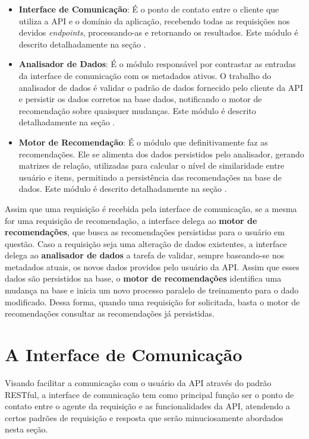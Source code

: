\documentclass[12pt, openright, oneside, a4paper, brazil]{abntex2}
\begin{document}
\begin{itemize}

	\item \textbf{Interface de Comunicação}: É o ponto de contato entre o cliente que utiliza a API e o domínio da aplicação, recebendo todas as requisições nos devidos \textit{endpoints}, processando-as e retornando os resultados. Este módulo é descrito detalhadamente na seção .

	\item \textbf{Analisador de Dados}: É o módulo responsável por contrastar as entradas da interface de comunicação com os metadados ativos. O trabalho do analisador de dados é validar o padrão de dados fornecido pelo cliente da API e persistir os dados corretos na base dados, notificando o motor de recomendação sobre quaisquer mudanças. Este módulo é descrito detalhadamente na seção .

	\item \textbf{Motor de Recomendação}: É o módulo que definitivamente faz as recomendações. Ele se alimenta dos dados persistidos pelo analisador, gerando matrizes de relação, utilizadas para calcular o nível de similaridade entre usuário e itens, permitindo a persistência das recomendações na base de dados. Este módulo é descrito detalhadamente na seção .

\end{itemize}

Assim que uma requisição é recebida pela interface de comunicação, se a mesma for uma requisição de recomendação, a interface delega ao \textbf{motor de recomendações}, que busca as recomendações persistidas para o usuário em questão. Caso a requisição seja uma alteração de dados existentes, a interface delega ao \textbf{analisador de dados} a tarefa de validar, sempre baseando-se nos metadados atuais, os novos dados providos pelo usuário da API. Assim que esses dados são persistidos na base, o \textbf{motor de recomendações} identifica uma mudança na base e inicia um novo processo paralelo de treinamento para o dado modificado. Dessa forma, quando uma requisição for solicitada, basta o motor de recomendações consultar as recomendações já persistidas.

\section{A Interface de Comunicação} \label{interface}

Visando facilitar a comunicação com o usuário da API através do padrão RESTful, a interface de comunicação tem como principal função ser o ponto de contato entre o agente da requisição e as funcionalidades da API, atendendo a certos padrões de requisição e resposta que serão minuciosamente abordados nesta seção.
\end{document}
